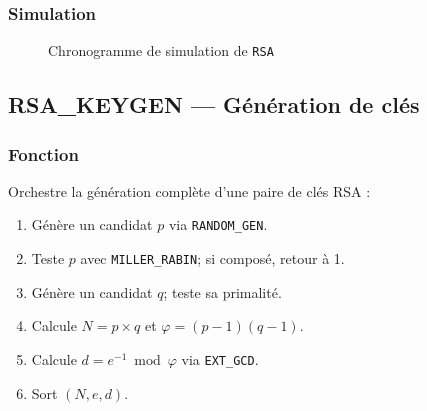 \subsubsection{Simulation}
\begin{figure}[H]
\centering
{}
\caption{Chronogramme de simulation de \texttt{RSA}}
\label{fig:sim_rsa}
\end{figure}


\subsection{RSA\_KEYGEN --- Génération de clés}
\label{sec:keygen}

\subsubsection{Fonction}
Orchestre la génération complète d'une paire de clés RSA :
\begin{enumerate}
  \item Génère un candidat $p$ via \texttt{RANDOM\_GEN}.
  \item Teste $p$ avec \texttt{MILLER\_RABIN}; si composé, retour à 1.
  \item Génère un candidat $q$; teste sa primalité.
  \item Calcule $N = p \times q$ et $\varphi = (p-1)(q-1)$.
  \item Calcule $d = e^{-1} \bmod \varphi$ via \texttt{EXT\_GCD}.
  \item Sort $(N, e, d)$.
\end{enumerate}

